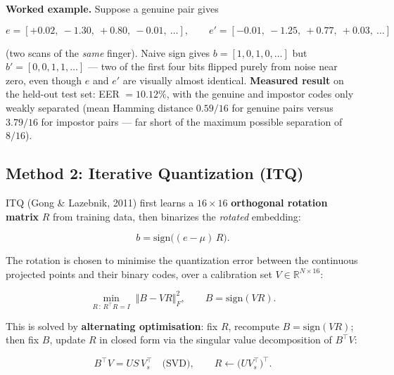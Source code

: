 \documentclass[11pt]{article}
\begin{document}
\textbf{Worked example.} Suppose a genuine pair gives

\begin{equation}
e = [+0.02,\ -1.30,\ +0.80,\ -0.01,\ \ldots], \qquad
e' = [-0.01,\ -1.25,\ +0.77,\ +0.03,\ \ldots]
\end{equation}

(two scans of the \emph{same} finger). Naive sign gives $b=[1,0,1,0,\ldots]$ but
$b'=[0,0,1,1,\ldots]$ --- two of the first four bits flipped purely from noise near zero,
even though $e$ and $e'$ are visually almost identical. \textbf{Measured result} on the
held-out test set: EER $=10.12\%$, with the genuine and impostor codes only weakly
separated (mean Hamming distance $0.59/16$ for genuine pairs versus $3.79/16$ for impostor
pairs --- far short of the maximum possible separation of $8/16$).

\subsection{Method 2: Iterative Quantization (ITQ)}

ITQ (Gong \& Lazebnik, 2011) first learns a $16\times16$ \textbf{orthogonal rotation
matrix} $R$ from training data, then binarizes the \emph{rotated} embedding:

\begin{equation}
b = \mathrm{sign}\big((e-\mu)\,R\big).
\end{equation}

The rotation is chosen to minimise the quantization error between the continuous projected
points and their binary codes, over a calibration set $V \in \mathbb{R}^{N\times16}$:

\begin{equation}
\min_{R \,:\, R^{\!\top}\!R = I} \; \big\Vert B - V R \big\Vert_F^2 , \qquad
B = \mathrm{sign}(VR).
\end{equation}

This is solved by \textbf{alternating optimisation}: fix $R$, recompute $B=\mathrm{sign}(VR)$;
then fix $B$, update $R$ in closed form via the singular value decomposition of $B^{\!\top}V$:

\begin{equation}
B^{\!\top} V = U S \,V_s^{\!\top} \quad \text{(SVD)}, \qquad R \leftarrow \big(U V_s^{\!\top}\big)^{\!\top}.
\end{equation}
\end{document}
